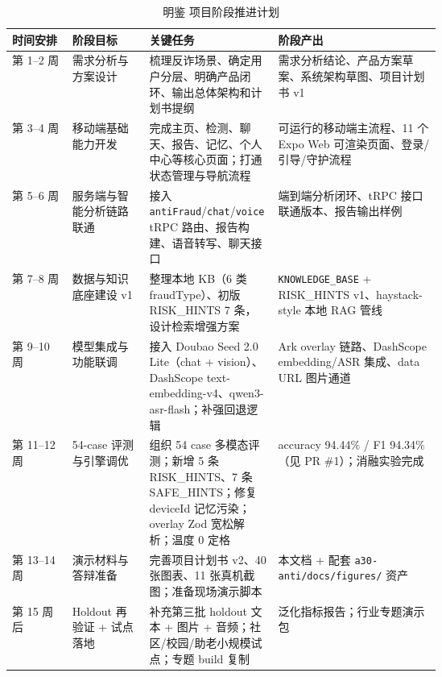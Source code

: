 \documentclass[UTF8,a4paper,12pt]{ctexart}
\begin{document}
\begin{table}[!htbp]
    \centering
    \caption{明鉴 项目阶段推进计划}
    \label{tab:project-schedule}
    \renewcommand{\arraystretch}{1.5}
    \begin{tabularx}{\linewidth}{p{0.14\linewidth}p{0.18\linewidth}p{0.30\linewidth}Y}
        \toprule
        时间安排 & 阶段目标 & 关键任务 & 阶段产出 \\
        \midrule
        第 1--2 周\newline{\small [已完成]} & 需求分析与方案设计 & 梳理反诈场景、确定用户分层、明确产品闭环、输出总体架构和计划书提纲 & 需求分析结论、产品方案草案、系统架构草图、项目计划书 v1 \\
        第 3--4 周\newline{\small [已完成]} & 移动端基础能力开发 & 完成主页、检测、聊天、报告、记忆、个人中心等核心页面；打通状态管理与导航流程 & 可运行的移动端主流程、11 个 Expo Web 可渲染页面、登录/引导/守护流程 \\
        第 5--6 周\newline{\small [已完成]} & 服务端与智能分析链路联通 & 接入 \texttt{antiFraud}/\texttt{chat}/\texttt{voice} tRPC 路由、报告构建、语音转写、聊天接口 & 端到端分析闭环、tRPC 接口联通版本、报告输出样例 \\
        第 7--8 周\newline{\small [已完成]} & 数据与知识底座建设 v1 & 整理本地 KB（6 类 fraudType）、初版 RISK\_HINTS 7 条，设计检索增强方案 & \texttt{KNOWLEDGE\_BASE} + RISK\_HINTS v1、haystack-style 本地 RAG 管线 \\
        第 9--10 周\newline{\small [已完成]} & 模型集成与功能联调 & 接入 Doubao Seed 2.0 Lite（chat + vision）、DashScope text-embedding-v4、qwen3-asr-flash；补强回退逻辑 & Ark overlay 链路、DashScope embedding/ASR 集成、data URL 图片通道 \\
        第 11--12 周\newline{\small [已完成]} & 54-case 评测与引擎调优 & 组织 54 case 多模态评测；新增 5 条 RISK\_HINTS、7 条 SAFE\_HINTS；修复 deviceId 记忆污染；overlay Zod 宽松解析；温度 0 定格 & accuracy 94.44\% / F1 94.34\%（见 PR \#1）；消融实验完成 \\
        第 13--14 周\newline{\small [进行中]} & 演示材料与答辩准备 & 完善项目计划书 v2、40 张图表、11 张真机截图；准备现场演示脚本 & 本文档 + 配套 \texttt{a30-anti/docs/figures/} 资产 \\
        第 15 周后\newline{\small [规划]} & Holdout 再验证 + 试点落地 & 补充第三批 holdout 文本 + 图片 + 音频；社区/校园/助老小规模试点；专题 build 复制 & 泛化指标报告；行业专题演示包 \\
        \bottomrule
    \end{tabularx}
\end{table}
\end{document}
